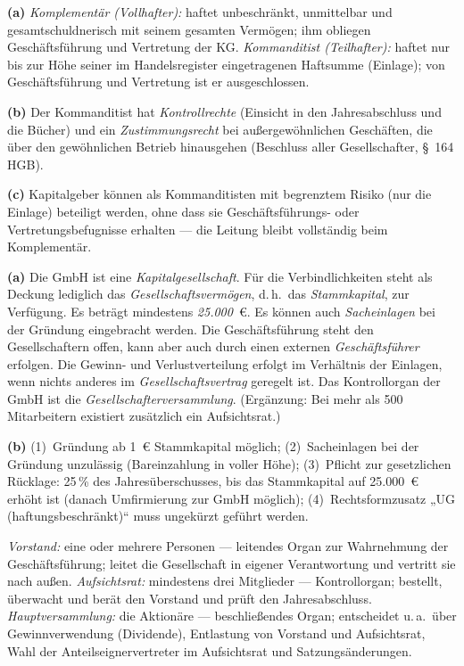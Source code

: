 \documentclass[11pt, a4paper]{article}
\begin{document}
\begin{loesung}[title={Lösung Aufgabe~6 --- Kommanditgesellschaft}]
\textbf{(a)} \emph{Komplementär (Vollhafter):} haftet unbeschränkt, unmittelbar und
gesamtschuldnerisch mit seinem gesamten Vermögen; ihm obliegen Geschäftsführung und
Vertretung der KG. \emph{Kommanditist (Teilhafter):} haftet nur bis zur Höhe seiner im
Handelsregister eingetragenen Haftsumme (Einlage); von Geschäftsführung und Vertretung
ist er ausgeschlossen.

\textbf{(b)} Der Kommanditist hat \emph{Kontrollrechte} (Einsicht in den Jahresabschluss
und die Bücher) und ein \emph{Zustimmungsrecht} bei außergewöhnlichen Geschäften, die
über den gewöhnlichen Betrieb hinausgehen (Beschluss aller Gesellschafter, §~164 HGB).

\textbf{(c)} Kapitalgeber können als Kommanditisten mit begrenztem Risiko (nur die
Einlage) beteiligt werden, ohne dass sie Geschäftsführungs- oder Vertretungsbefugnisse
erhalten --- die Leitung bleibt vollständig beim Komplementär.
\end{loesung}

\begin{loesung}[title={Lösung Aufgabe~7 --- GmbH und UG}]
\textbf{(a)} Die GmbH ist eine \emph{Kapitalgesellschaft}. Für die Verbindlichkeiten
steht als Deckung lediglich das \emph{Gesellschaftsvermögen}, d.\,h.\ das
\emph{Stammkapital}, zur Verfügung. Es beträgt mindestens \emph{25.000}~€. Es können auch
\emph{Sacheinlagen} bei der Gründung eingebracht werden. Die Geschäftsführung steht den
Gesellschaftern offen, kann aber auch durch einen externen \emph{Geschäftsführer}
erfolgen. Die Gewinn- und Verlustverteilung erfolgt im Verhältnis der Einlagen, wenn
nichts anderes im \emph{Gesellschaftsvertrag} geregelt ist. Das Kontrollorgan der GmbH
ist die \emph{Gesellschafterversammlung}. (Ergänzung: Bei mehr als 500 Mitarbeitern existiert
zusätzlich ein Aufsichtsrat.)

\textbf{(b)} (1)~Gründung ab 1~€ Stammkapital möglich; (2)~Sacheinlagen bei der Gründung
unzulässig (Bareinzahlung in voller Höhe); (3)~Pflicht zur gesetzlichen Rücklage: 25\,\%
des Jahresüberschusses, bis das Stammkapital auf 25.000~€ erhöht ist (danach
Umfirmierung zur GmbH möglich); (4)~Rechtsformzusatz „UG (haftungsbeschränkt)`` muss ungekürzt geführt werden.
\end{loesung}

\begin{loesung}[title={Lösung Aufgabe~8 --- Organe der AG}]
\emph{Vorstand:} eine oder mehrere Personen --- leitendes Organ zur Wahrnehmung der
Geschäftsführung; leitet die Gesellschaft in eigener Verantwortung und vertritt sie nach
außen.
\emph{Aufsichtsrat:} mindestens drei Mitglieder --- Kontrollorgan; bestellt, überwacht
und berät den Vorstand und prüft den Jahresabschluss.
\emph{Hauptversammlung:} die Aktionäre --- beschließendes Organ; entscheidet u.\,a.\ über
Gewinnverwendung (Dividende), Entlastung von Vorstand und Aufsichtsrat, Wahl der
Anteilseignervertreter im Aufsichtsrat und Satzungsänderungen.
\end{loesung}
\end{document}
